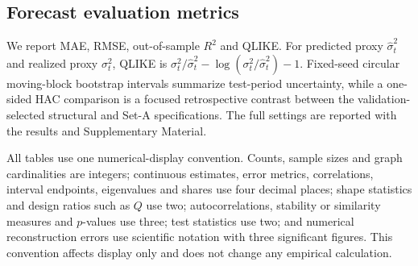 \subsection{Forecast evaluation metrics}
\label{subsec:forecast_metrics}
\label{subsec:evaluation_method}

We report MAE, RMSE, out-of-sample $R^2$ and QLIKE. For predicted proxy $\hat{\sigma}^2_t$ and realized proxy $\sigma^2_t$, QLIKE is $\sigma^2_t/\hat{\sigma}^2_t-\log(\sigma^2_t/\hat{\sigma}^2_t)-1$. Fixed-seed circular moving-block bootstrap intervals summarize test-period uncertainty, while a one-sided HAC comparison is a focused retrospective contrast between the validation-selected structural and Set-A specifications. The full settings are reported with the results and Supplementary Material.

All tables use one numerical-display convention. Counts, sample sizes and graph cardinalities are integers; continuous estimates, error metrics, correlations, interval endpoints, eigenvalues and shares use four decimal places; shape statistics and design ratios such as $Q$ use two; autocorrelations, stability or similarity measures and $p$-values use three; test statistics use two; and numerical reconstruction errors use scientific notation with three significant figures. This convention affects display only and does not change any empirical calculation.
